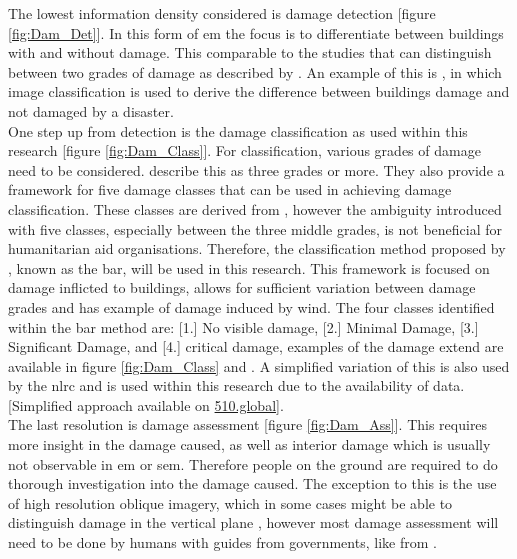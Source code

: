 \noindent The lowest information density considered is damage detection [figure  \ref{fig:Dam_Det}]. In this form of \ac{em} the focus is to differentiate between buildings with and without damage. This comparable to the studies that can distinguish between two grades of damage as described by \citet{Dong2013}. An example of this is \citet{Wang2012}, in which image classification is used to derive the difference between buildings damage and not damaged by a disaster.\\

\noindent One step up from detection is the damage classification as used within this research [figure  \ref{fig:Dam_Class}]. For classification, various grades of damage need to be considered. \cite{Dong2013} describe this as three grades or more. They also provide a framework for five damage classes that can be used in achieving damage classification. These classes are derived from \citet{Grunthal1998}, however the ambiguity introduced with five classes, especially between the three middle grades, is not beneficial for humanitarian aid organisations. Therefore, the classification method proposed by \citet{AlAchkar2008}, known as the \ac{bar}, will be used in this research. This framework is focused on damage inflicted to buildings, allows for sufficient variation between damage grades and has example of damage induced by wind. The four classes identified within the \ac{bar} method are: [1.] No visible damage, [2.] Minimal Damage, [3.] Significant Damage, and [4.] critical damage, examples of the damage extend are available in figure \ref{fig:Dam_Class} and \citet{AlAchkar2008}. A simplified variation of this is also used by the \ac{nlrc} and is used within this research due to the availability of data. [Simplified approach available on \href{https://www.510.global/visual-guide-damage-assesment/}{510.global}].\\

\noindent The last resolution is damage assessment [figure  \ref{fig:Dam_Ass}]. This requires more insight in the damage caused, as well as interior damage which is usually not observable in \ac{em} or \ac{sem}. Therefore people on the ground are required to do thorough investigation into the damage caused. The exception to this is the use of high resolution oblique imagery, which in some cases might be able to distinguish damage in the vertical plane \citep{Vetrivel2016a}, however most damage assessment will need to be done by humans with guides from governments, like from \citet{FEMA2016}.\\

